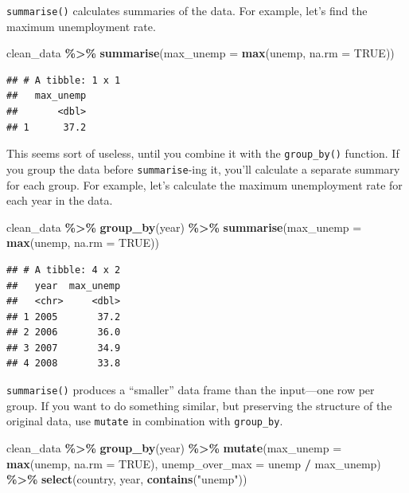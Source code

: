 \documentclass[
  12pt,
  oneside,openany]{book}
\newenvironment{Shaded}{\begin{snugshade}}{\end{snugshade}}
\newcommand{\DataTypeTok}[1]{\textcolor[rgb]{0.13,0.29,0.53}{#1}}
\newcommand{\KeywordTok}[1]{\textcolor[rgb]{0.13,0.29,0.53}{\textbf{#1}}}
\newcommand{\NormalTok}[1]{#1}
\newcommand{\OperatorTok}[1]{\textcolor[rgb]{0.81,0.36,0.00}{\textbf{#1}}}
\newcommand{\OtherTok}[1]{\textcolor[rgb]{0.56,0.35,0.01}{#1}}
\newcommand{\StringTok}[1]{\textcolor[rgb]{0.31,0.60,0.02}{#1}}
\begin{document}
\texttt{summarise()} calculates summaries of the data. For example, let's find the maximum unemployment rate.

\begin{Shaded}
\begin{Highlighting}[]
\NormalTok{clean\_data }\OperatorTok{\%>\%}
\StringTok{  }\KeywordTok{summarise}\NormalTok{(}\DataTypeTok{max\_unemp =} \KeywordTok{max}\NormalTok{(unemp, }\DataTypeTok{na.rm =} \OtherTok{TRUE}\NormalTok{))}
\end{Highlighting}
\end{Shaded}

\begin{verbatim}
## # A tibble: 1 x 1
##   max_unemp
##       <dbl>
## 1      37.2
\end{verbatim}

This seems sort of useless, until you combine it with the \texttt{group\_by()} function. If you group the data before \texttt{summarise}-ing it, you'll calculate a separate summary for each group. For example, let's calculate the maximum unemployment rate for each year in the data.

\begin{Shaded}
\begin{Highlighting}[]
\NormalTok{clean\_data }\OperatorTok{\%>\%}
\StringTok{  }\KeywordTok{group\_by}\NormalTok{(year) }\OperatorTok{\%>\%}
\StringTok{  }\KeywordTok{summarise}\NormalTok{(}\DataTypeTok{max\_unemp =} \KeywordTok{max}\NormalTok{(unemp, }\DataTypeTok{na.rm =} \OtherTok{TRUE}\NormalTok{))}
\end{Highlighting}
\end{Shaded}

\begin{verbatim}
## # A tibble: 4 x 2
##   year  max_unemp
##   <chr>     <dbl>
## 1 2005       37.2
## 2 2006       36.0
## 3 2007       34.9
## 4 2008       33.8
\end{verbatim}

\texttt{summarise()} produces a ``smaller'' data frame than the input---one row per group. If you want to do something similar, but preserving the structure of the original data, use \texttt{mutate} in combination with \texttt{group\_by}.

\begin{Shaded}
\begin{Highlighting}[]
\NormalTok{clean\_data }\OperatorTok{\%>\%}
\StringTok{  }\KeywordTok{group\_by}\NormalTok{(year) }\OperatorTok{\%>\%}
\StringTok{  }\KeywordTok{mutate}\NormalTok{(}\DataTypeTok{max\_unemp =} \KeywordTok{max}\NormalTok{(unemp, }\DataTypeTok{na.rm =} \OtherTok{TRUE}\NormalTok{),}
         \DataTypeTok{unemp\_over\_max =}\NormalTok{ unemp }\OperatorTok{/}\StringTok{ }\NormalTok{max\_unemp) }\OperatorTok{\%>\%}
\StringTok{  }\KeywordTok{select}\NormalTok{(country, year, }\KeywordTok{contains}\NormalTok{(}\StringTok{"unemp"}\NormalTok{))}
\end{Highlighting}
\end{Shaded}
\end{document}
